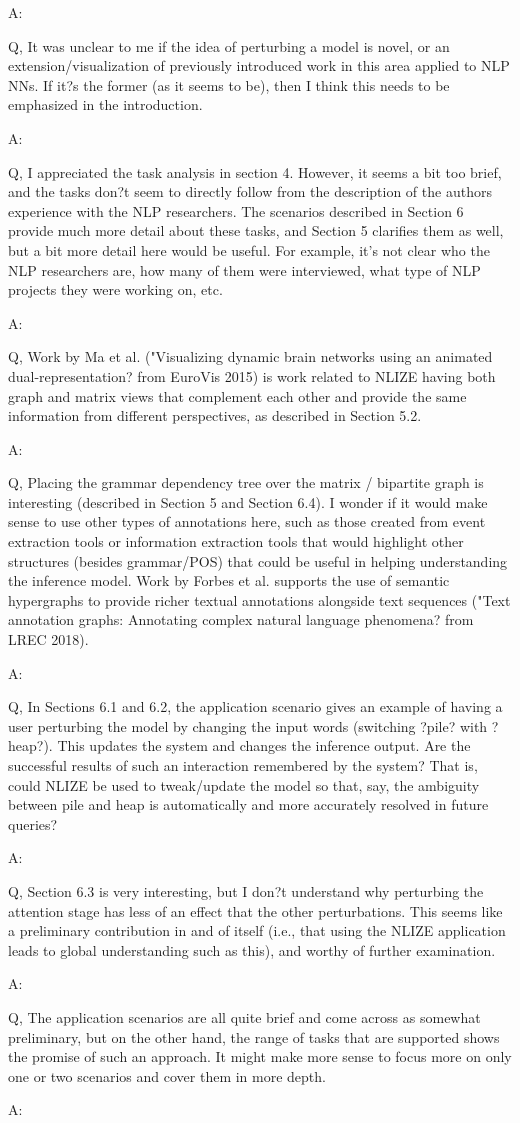 A:

Q, It was unclear to me if the idea of perturbing a model is novel, or an extension/visualization of previously introduced work in this area applied to NLP NNs. If it?s the former (as it seems to be), then I think this needs to be emphasized in the introduction.

A:

Q, I appreciated the task analysis in section 4. However, it seems a bit too brief, and the tasks don?t seem to directly follow from the description of the authors experience with the NLP researchers. The scenarios described in Section 6 provide much more detail about these tasks, and Section 5 clarifies them as well, but a bit more detail here would be useful. For example, it's not clear who the NLP researchers are, how many of them were interviewed, what type of NLP projects they were working on, etc.

A:

Q, Work by Ma et al. ("Visualizing dynamic brain networks using an animated dual-representation? from EuroVis 2015) is work related to NLIZE having both graph and matrix views that complement each other and provide the same information from different perspectives, as described in Section 5.2.

A:

Q, Placing the grammar dependency tree over the matrix / bipartite graph is interesting (described in Section 5 and Section 6.4). I wonder if it would make sense to use other types of annotations here, such as those created from event extraction tools or information extraction tools that would highlight other structures (besides grammar/POS) that could be useful in helping understanding the inference model. Work by Forbes et al. supports the use of semantic hypergraphs to provide richer textual annotations alongside text sequences ("Text annotation graphs: Annotating complex natural language phenomena? from LREC 2018).

A:

Q, In Sections 6.1 and 6.2, the application scenario gives an example of having a user perturbing the model by changing the input words (switching ?pile? with ?heap?). This updates the system and changes the inference output. Are the successful results of such an interaction remembered by the system? That is, could NLIZE be used to tweak/update the model so that, say, the ambiguity between pile and heap is automatically and more accurately resolved in future queries?

A:

Q, Section 6.3 is very interesting, but I don?t understand why perturbing the attention stage has less of an effect that the other perturbations. This seems like a preliminary contribution in and of itself (i.e., that using the NLIZE application leads to global understanding such as this), and worthy of further examination.

A:

Q, The application scenarios are all quite brief and come across as somewhat preliminary, but on the other hand, the range of tasks that are supported shows the promise of such an approach. It might make more sense to focus more on only one or two scenarios and cover them in more depth.

A:
